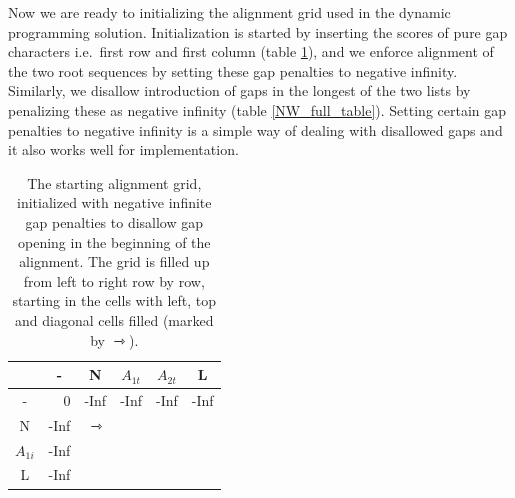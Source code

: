 Now we are ready to initializing the alignment grid used in the dynamic programming solution.
Initialization is started by inserting the scores of pure gap characters i.e.\ first row and first column (table \ref{NW_fill_table1}), and we enforce alignment of the two root sequences by setting these gap penalties to negative infinity.
Similarly, we disallow introduction of gaps in the longest of the two lists by penalizing these as negative infinity (table \ref{NW_full_table}).
Setting certain gap penalties to negative infinity is a simple way of dealing with disallowed gaps and it also works well for implementation.
\begin{table}[ht!]
\centering
\begin{tabular}{c|r|r|r|r|r|}
\rowcolor[HTML]{EFEFEF}
                                 & \multicolumn{1}{c|}{\cellcolor[HTML]{EFEFEF}-} & \multicolumn{1}{c|}{\cellcolor[HTML]{EFEFEF}N} & \multicolumn{1}{c|}{\cellcolor[HTML]{EFEFEF}$A_{1t}$} & \multicolumn{1}{c|}{\cellcolor[HTML]{EFEFEF}$A_{2t}$} & \multicolumn{1}{c|}{\cellcolor[HTML]{EFEFEF}L} \\ \hline
\cellcolor[HTML]{EFEFEF}-        & 0                                              & -Inf                                            & -Inf                                                   & -Inf                                                   & -Inf                                            \\ \hline
\cellcolor[HTML]{EFEFEF}N        & -Inf                                            & $\rightarrowtriangle$                                            &                                                    &                                                    &                                             \\ \hline
\cellcolor[HTML]{EFEFEF}$A_{1i}$ & -Inf                                            &                                             &                                                    &                                                    &                                             \\ \hline
\cellcolor[HTML]{EFEFEF}L        & -Inf                                            &                                             &                                                    &                                                    &                                             \\ \hline
\end{tabular}
    \caption{
         \label{NW_fill_table1}
             The starting alignment grid, initialized with negative infinite gap penalties to disallow gap opening in the beginning of the alignment.
             The grid is filled up from left to right row by row, starting in the cells with left, top and diagonal cells filled (marked by $\rightarrowtriangle$).
             }
\end{table}

